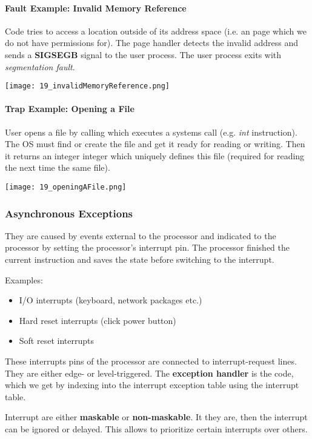 \paragraph{Fault Example: Invalid Memory Reference}
Code tries to access a location outside of its address space (i.e. an page which we do not have permissions for). The page handler detects the invalid address and sends a \textbf{SIGSEGB} signal to the user process. The user process exits with \textit{segmentation fault}.

\texttt{[image: 19\_invalidMemoryReference.png]}

\paragraph{Trap Example: Opening a File}
User opens a file by calling  which executes a systems call (e.g. \textit{int} instruction). The OS must find or create the file and get it ready for reading or writing. Then it returns an integer integer which uniquely defines this file (required for reading the next time the same file).

\texttt{[image: 19\_openingAFile.png]}

\subsubsection{Asynchronous Exceptions}
They are caused by events external to the processor and indicated to the processor by setting the processor's interrupt pin. The processor finished the current instruction and saves the state before switching to the interrupt.

Examples:
\begin{itemize}
    \item I/O interrupts (keyboard, network packages etc.)
    \item Hard reset interrupts (click power button)
    \item Soft reset interrupts
\end{itemize}

These interrupts pins of the processor are connected to interrupt-request lines. They are either edge- or level-triggered. The \textbf{exception handler} is the code, which we get by indexing into the interrupt exception table using the interrupt table.

Interrupt are either \textbf{maskable} or \textbf{non-maskable}. It they are, then the interrupt can be ignored or delayed. This allows to prioritize certain interrupts over others.

